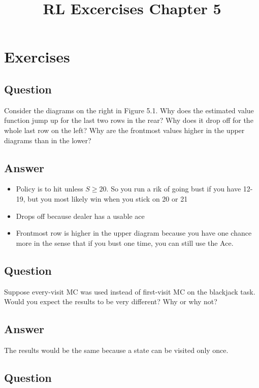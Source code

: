 \documentclass[11pt]{article}
\title{RL Excercises Chapter 5}
\begin{document}
    \maketitle
    \setcounter{section}{4}


    \section{Exercises}

    \subsection{Question}
    Consider the diagrams on the right in Figure 5.1.
    Why does the estimated value function jump up for the last two rows in the rear?
    Why does it drop off for the whole last row on the left?
    Why are the frontmost values higher in the upper diagrams than in the lower?

    \subsection*{Answer}
    \begin{itemize}
        \item Policy is to hit unless $S \geq 20$. So you run a rik of going bust if you have 12-19, but you most likely win when you stick on 20 or 21
        \item Drops off because dealer has a usable ace
        \item Frontmost row is higher in the upper diagram because you have one chance more in the sense that if you bust one time, you can still use the Ace.
    \end{itemize}

    \subsection{Question}

    Suppose every-visit MC was used instead of first-visit MC on the blackjack task.
    Would you expect the results to be very different?
    Why or why not?

    \subsection*{Answer}

    The results would be the same because a state can be visited only once.

    \subsection{Question}
\end{document}
